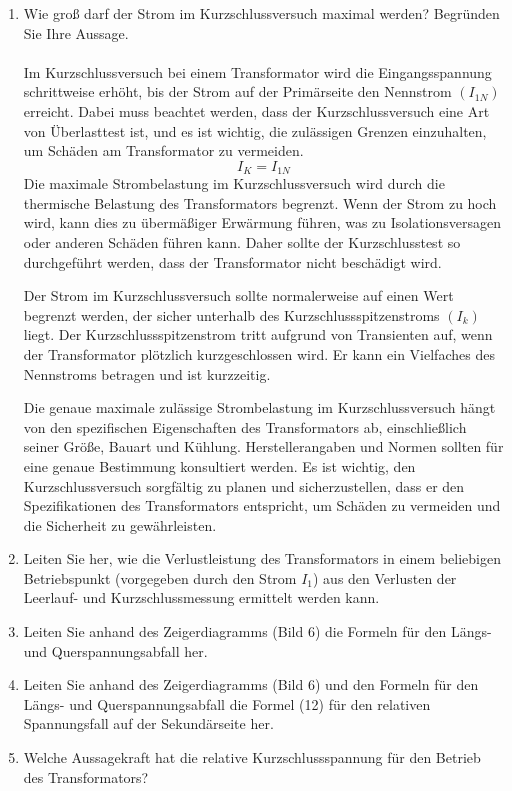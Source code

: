 \begin{enumerate}[label=\alph*)]
  
  
  
  
  \item Wie groß darf der Strom im Kurzschlussversuch maximal werden? Begründen Sie Ihre Aussage.\\ \ \\
  
  Im Kurzschlussversuch bei einem Transformator wird die Eingangsspannung schrittweise erhöht, bis der Strom auf der Primärseite den Nennstrom $(I_{1N})$ erreicht. Dabei muss beachtet werden, dass der Kurzschlussversuch eine Art von Überlasttest ist, und es ist wichtig, die zulässigen Grenzen einzuhalten, um Schäden am Transformator zu vermeiden.
  \[ I_K = I_{1N} \]
  Die maximale Strombelastung im Kurzschlussversuch wird durch die thermische Belastung des Transformators begrenzt. Wenn der Strom zu hoch wird, kann dies zu übermäßiger Erwärmung führen, was zu Isolationsversagen oder anderen Schäden führen kann. Daher sollte der Kurzschlusstest so durchgeführt werden, dass der Transformator nicht beschädigt wird.
  
  Der Strom im Kurzschlussversuch sollte normalerweise auf einen Wert begrenzt werden, der sicher unterhalb des Kurzschlussspitzenstroms $(I_{k})$ liegt. Der Kurzschlussspitzenstrom tritt aufgrund von Transienten auf, wenn der Transformator plötzlich kurzgeschlossen wird. Er kann ein Vielfaches des Nennstroms betragen und ist kurzzeitig.
  
  Die genaue maximale zulässige Strombelastung im Kurzschlussversuch hängt von den spezifischen Eigenschaften des Transformators ab, einschließlich seiner Größe, Bauart und Kühlung. Herstellerangaben und Normen sollten für eine genaue Bestimmung konsultiert werden. Es ist wichtig, den Kurzschlussversuch sorgfältig zu planen und sicherzustellen, dass er den Spezifikationen des Transformators entspricht, um Schäden zu vermeiden und die Sicherheit zu gewährleisten.
  
  \item Leiten Sie her, wie die Verlustleistung des Transformators in einem beliebigen Betriebspunkt (vorgegeben durch den Strom $I_1$) aus den Verlusten der Leerlauf- und Kurzschlussmessung ermittelt werden kann.  
  \item Leiten Sie anhand des Zeigerdiagramms (Bild 6) die Formeln für den Längs- und Querspannungsabfall her.  
  \item Leiten Sie anhand des Zeigerdiagramms (Bild 6) und den Formeln für den Längs- und Querspannungsabfall die Formel (12) für den relativen Spannungsfall auf der Sekundärseite her. 
  \item Welche Aussagekraft hat die relative Kurzschlussspannung für den Betrieb des Transformators? 
  

\end{enumerate}
